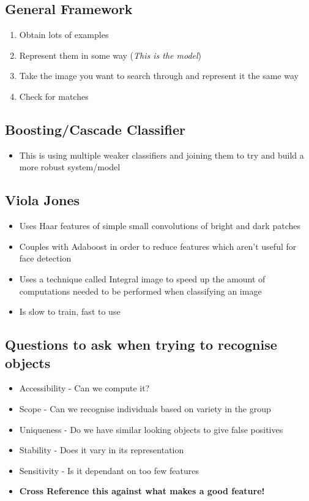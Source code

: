 \documentclass[a4paper]{article}
\begin{document}
\subsection{General Framework}
\label{sec-3-1}
\begin{enumerate}
\item Obtain lots of examples
\item Represent them in some way (\emph{This is the model})
\item Take the image you want to search through and represent it the same way
\item Check for matches
\end{enumerate}

\subsection{Boosting/Cascade Classifier}
\label{sec-3-2}
\begin{itemize}
\item This is using multiple weaker classifiers and joining them to try and build a more robust system/model
\end{itemize}

\subsection{Viola Jones}
\label{sec-3-3}
\begin{itemize}
\item Uses Haar features of simple small convolutions of bright and dark patches
\item Couples with Adaboost in order to reduce features which aren't useful for face detection
\item Uses a technique called Integral image to speed up the amount of computations needed to be performed when classifying an image
\item Is slow to train, fast to use
\end{itemize}

\subsection{Questions to ask when trying to recognise objects}
\label{sec-3-4}
\begin{itemize}
\item Accessibility - Can we compute it?
\item Scope - Can we recognise individuals based on variety in the group
\item Uniqueness - Do we have similar looking objects to give false positives
\item Stability - Does it vary in its representation
\item Sensitivity - Is it dependant on too few features
\item \textbf{Cross Reference this against what makes a good feature!}
\end{itemize}
\end{document}
